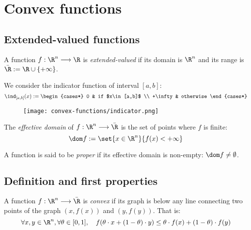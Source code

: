 \section{Convex functions}
\subsection{Extended-valued functions}
\begin{definition}
    A function $f: \R^n \longrightarrow \R$ is \emph{extended-valued} if its domain is $\R^n$ and its range is $\bar{\R} := \R \cup \{+\infty\}$.
\end{definition}

\begin{example}
    We consider the indicator function of interval $[a, b]$:
    \begin{equation*}
        \ind_{[a,b]}(x) := \begin{cases*}
            0 & if $x\in[a,b]$ \\
            +\infty & otherwise
        \end{cases*}
    \end{equation*}
    \begin{figure}[H]
        \centering
        \texttt{[image: convex-functions/indicator.png]}
    \end{figure}
\end{example}

\begin{definition}
    The \emph{effective domain} of $f:\R^n\longrightarrow\bar{\R}$ is the set of points where $f$ is finite:
    \begin{equation}
        \dom f := \set{x\in\R^n}{f(x)<+\infty}
    \end{equation}
\end{definition}

A function is said to be \emph{proper} if its effective domain is non-empty: $\dom f \neq \emptyset$.

\subsection{Definition and first properties}
\begin{definition}
    A function $f:\R^n\longrightarrow\bar{\R}$ is \emph{convex} if its graph is below any line connecting two points of the graph $(x, f(x))$ and $(y, f(y))$. That is:
    \begin{equation}
        \forall x,y\in\R^n, \forall\theta\in[0,1], \quad f(\theta\cdot x + (1-\theta)\cdot y) \leq \theta\cdot f(x) + (1-\theta)\cdot f(y)
    \end{equation}
\end{definition}

